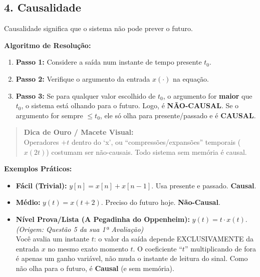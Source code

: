 \subsection{4. Causalidade}\label{causalidade}

Causalidade significa que o sistema não pode prever o futuro.

\textbf{Algoritmo de Resolução:}

\begin{enumerate}
\def\labelenumi{\arabic{enumi}.}
\tightlist
\item
  \textbf{Passo 1:} Considere a saída num instante de tempo presente \(t_0\).
\item
  \textbf{Passo 2:} Verifique o argumento da entrada \(x(\cdot)\) na equação.
\item
  \textbf{Passo 3:} Se para qualquer valor escolhido de \(t_0\), o argumento for \textbf{maior} que \(t_0\), o sistema está olhando para o futuro. Logo, é \textbf{NÃO-CAUSAL}. Se o argumento for sempre \(\le t_0\), ele só olha para presente/passado e é \textbf{CAUSAL}.
\end{enumerate}

\begin{quote}
\textbf{Dica de Ouro / Macete Visual:}\\
Operadores \(+t\) dentro do `x', ou ``compressões/expansões'' temporais (\(x(2t)\)) costumam ser não-causais. Todo sistema sem memória é causal.
\end{quote}

\textbf{Exemplos Práticos:}

\begin{itemize}
\item
  \textbf{Fácil (Trivial):} \(y[n] = x[n] + x[n-1]\). Usa presente e passado. \textbf{Causal}.
\item
  \textbf{Médio:} \(y(t) = x(t+2)\). Preciso do futuro hoje. \textbf{Não-Causal}.
\item
  \textbf{Nível Prova/Lista (A Pegadinha do Oppenheim):} \(y(t) = t \cdot x(t)\).\\
  \emph{(Origem: Questão 5 da sua 1ª Avaliação)}\\
  Você avalia um instante \(t\): o valor da saída depende EXCLUSIVAMENTE da entrada \(x\) no mesmo exato momento \(t\). O coeficiente ``\(t\)'' multiplicando de fora é apenas um ganho variável, não muda o instante de leitura do sinal. Como não olha para o futuro, é \textbf{Causal} (e sem memória).
\end{itemize}

